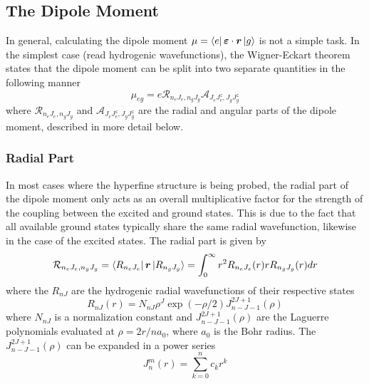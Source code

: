 \subsection{The Dipole Moment}
In general, calculating the dipole moment  $\mu = \bra{e} \bm{\varepsilon} \cdot \bm{r} \ket{g}$ is not a simple task. 
In the simplest case (read hydrogenic wavefunctions), the Wigner-Eckart theorem states that the dipole moment can be split into two separate quantities in the following manner \citep{LasCool}
\begin{equation}
\mu_{eg} = e \mathcal{R}_{n_e J_e, n_g J_g}\mathcal{A}_{J_eJ_e^z, J_gJ_g^z}
\label{muref}
\end{equation}
where $\mathcal{R}_{n_e J_e, n_g J_g}$ and $\mathcal{A}_{J_eJ_e^z, J_gJ_g^z}$ are the radial and angular parts of the dipole moment, described in more detail below. 
\subsubsection*{Radial Part}
In most cases where the hyperfine structure is being probed, the radial part of the dipole moment only acts as an overall multiplicative factor for the strength of the coupling between the excited and ground states. This is due to the fact that all available ground states typically share the same radial wavefunction, likewise in the case of the excited states. The radial part is given by
\begin{equation}
\mathcal{R}_{n_e J_e, n_g J_g} = \bra{R_{n_e J_e}}\bm{r}\ket{R_{n_g J_g}} = \int_0^{\infty}r^2R_{n_e J_e}(r)rR_{n_g J_g}(r)dr
\end{equation}
where the $R_{nJ}$ are the hydrogenic radial wavefunctions of their respective states
\begin{equation}
R_{nJ}(r) = N_{nJ}\rho^J\exp(-\rho/2)J_{n-J-1}^{2J+1}(\rho)
\end{equation}
where $N_{nJ}$ is a normalization constant and $J_{n-J-1}^{2J+1}(\rho)$ are the Laguerre polynomials evaluated at $\rho = 2r/na_0$, where $a_0$ is the Bohr radius. The $J_{n-J-1}^{2J+1}(\rho)$ can be expanded in a power series
\begin{equation}
J_{n}^{m}(r) = \sum_{k=0}^{n} c_kr^k
\end{equation}

